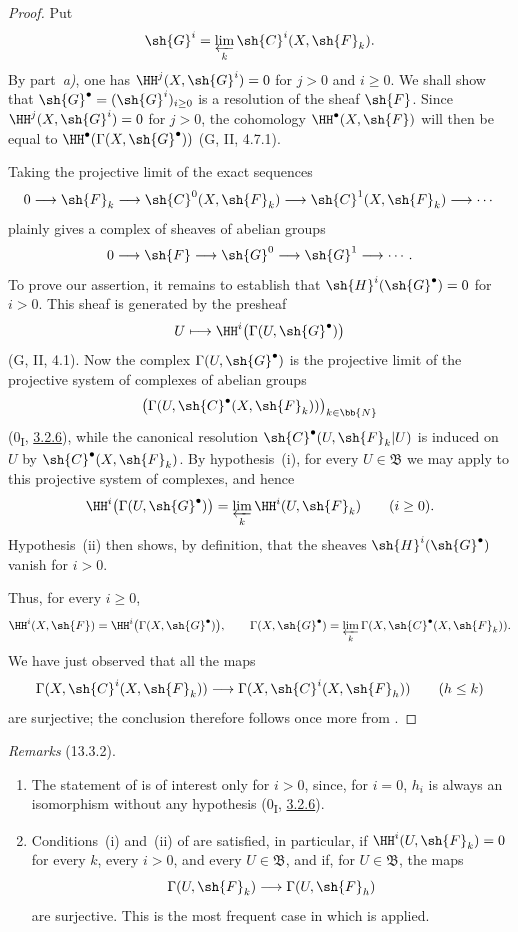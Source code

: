 \begin{proof}
Put
\[
  \sh{G}^i=\varprojlim_k\sh{C}^i(X,\sh{F}_k).
\]
By part~\emph{a)}, one has
$\HH^j(X,\sh{G}^i)=0$ for $j>0$ and $i\geq0$.
We shall show that
$\sh{G}^\bullet=(\sh{G}^i)_{i\geq0}$ is a resolution of the sheaf
$\sh{F}$. Since $\HH^j(X,\sh{G}^i)=0$ for $j>0$, the cohomology
$\HH^\bullet(X,\sh{F})$ will then be equal to
$\HH^\bullet(\Gamma(X,\sh{G}^\bullet))$ (G, II, 4.7.1).

Taking the projective limit of the exact sequences
\[
  0\longrightarrow\sh{F}_k
  \longrightarrow\sh{C}^0(X,\sh{F}_k)
  \longrightarrow\sh{C}^1(X,\sh{F}_k)
  \longrightarrow\cdots
\]
plainly gives a complex of sheaves of abelian groups
\[
  0\longrightarrow\sh{F}
  \longrightarrow\sh{G}^0
  \longrightarrow\sh{G}^1
  \longrightarrow\cdots.
\]
To prove our assertion, it remains to establish that
$\sh{H}^i(\sh{G}^\bullet)=0$ for $i>0$.
This sheaf is generated by the presheaf
\[
  U\longmapsto\HH^i\bigl(\Gamma(U,\sh{G}^\bullet)\bigr)
\]
(G, II, 4.1).
Now the complex $\Gamma(U,\sh{G}^\bullet)$ is the projective limit of
the projective system of complexes of abelian groups
\[
  \bigl(\Gamma(U,\sh{C}^\bullet(X,\sh{F}_k))\bigr)_{k\in\bb{N}}
\]
(0\textsubscript{I}, \hyperref[0.3.2.6]{3.2.6}), while the canonical resolution
$\sh{C}^\bullet(U,\sh{F}_k|U)$ is induced on $U$ by
$\sh{C}^\bullet(X,\sh{F}_k)$.
By hypothesis~{\rm(i)}, for every $U\in\mathfrak{B}$ we may apply
 to this projective system of complexes, and hence
\[
  \HH^i\bigl(\Gamma(U,\sh{G}^\bullet)\bigr)
  =
  \varprojlim_k\HH^i(U,\sh{F}_k)
  \qquad(i\geq0).
\]
Hypothesis~{\rm(ii)} then shows, by definition, that the sheaves
$\sh{H}^i(\sh{G}^\bullet)$ vanish for $i>0$.

Thus, for every $i\geq0$,
\[
  \HH^i(X,\sh{F})
  =
  \HH^i\bigl(\Gamma(X,\sh{G}^\bullet)\bigr),
  \qquad
  \Gamma(X,\sh{G}^\bullet)
  =
  \varprojlim_k\Gamma(X,\sh{C}^\bullet(X,\sh{F}_k)).
\]
We have just observed that all the maps
\[
  \Gamma(X,\sh{C}^i(X,\sh{F}_k))
  \longrightarrow
  \Gamma(X,\sh{C}^i(X,\sh{F}_h))
  \qquad(h\leq k)
\]
are surjective; the conclusion therefore follows once more from
.
\end{proof}

\begin{env}[13.3.2]
\label{0.13.3.2}
\emph{Remarks} (13.3.2).
\begin{enumerate}
  \item[{\rm(i)}]
  The statement of  is of interest only for $i>0$,
  since, for $i=0$, $h_i$ is always an isomorphism without any
  hypothesis (0\textsubscript{I}, \hyperref[0.3.2.6]{3.2.6}).

  \item[{\rm(ii)}]
  Conditions~{\rm(i)} and~{\rm(ii)} of  are satisfied,
  in particular, if
  $\HH^i(U,\sh{F}_k)=0$ for every $k$, every $i>0$, and every
  $U\in\mathfrak{B}$, and if, for $U\in\mathfrak{B}$, the maps
  \[
    \Gamma(U,\sh{F}_k)\longrightarrow\Gamma(U,\sh{F}_h)
  \]
  are surjective. This is the most frequent case in which
   is applied.
\end{enumerate}
\end{env}

